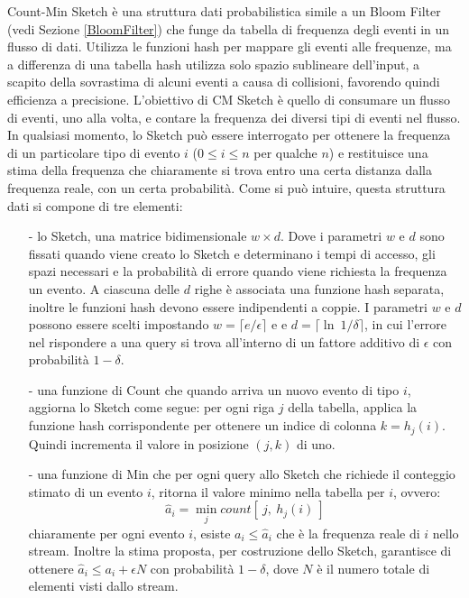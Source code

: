 \documentclass[../main.tex]{subfiles}
\begin{document}
Count-Min Sketch è una struttura dati probabilistica simile a un Bloom Filter (vedi Sezione \ref{BloomFilter}) che funge da tabella di frequenza degli eventi in un flusso di dati. Utilizza le funzioni hash per mappare gli eventi alle frequenze, ma a differenza di una tabella hash utilizza solo spazio sublineare dell'input, a scapito della sovrastima di alcuni eventi a causa di collisioni, favorendo quindi efficienza a precisione. L'obiettivo di CM Sketch è quello di consumare un flusso di eventi, uno alla volta, e contare la frequenza dei diversi tipi di eventi nel flusso. In qualsiasi momento, lo Sketch può essere interrogato per ottenere la frequenza di un particolare tipo di evento $i$ ($0 \leq i \leq n$ per qualche $n$) e restituisce una stima della frequenza che chiaramente si trova entro una certa distanza dalla frequenza reale, con un certa probabilità. Come si può intuire, questa struttura dati si compone di tre elementi: 
\begin{itemize}
\item[-] lo Sketch, una matrice bidimensionale $w \times d$. Dove i parametri $w$ e $d$ sono fissati quando viene creato lo Sketch e determinano i tempi di accesso, gli spazi necessari e la probabilità di errore quando viene richiesta la frequenza un evento. A ciascuna delle $d$ righe è associata una funzione hash separata, inoltre le funzioni hash devono essere indipendenti a coppie. I parametri  $w$ e $d$ possono essere scelti impostando $w = \lceil e / \epsilon \rceil$ e e $ d = \lceil \ln\ 1 / \delta \rceil$, in cui l'errore nel rispondere a una query si trova all'interno di un fattore additivo di $\epsilon$ con probabilità $1-\delta$.

\item[-] una funzione di Count che quando arriva un nuovo evento di tipo $i$, aggiorna lo Sketch come segue: per ogni riga $j$ della tabella, applica la funzione hash corrispondente per ottenere un indice di colonna $k = h_j (i)$. Quindi incrementa il valore in posizione $(j,k)$ di uno.

\item[-] una funzione di Min che per ogni query allo Sketch che richiede il conteggio stimato di un evento $i$, ritorna il valore minimo nella tabella per $i$, ovvero: $$\hat{a}_i = \min_{j} count[\ j,\ h_j (i)\ ]$$ chiaramente per ogni evento $i$, esiste $a_i \leq \hat{a}_i$ che è la frequenza reale di $i$ nello stream. Inoltre la stima proposta, per costruzione dello Sketch, garantisce di ottenere $\hat{a}_i \leq a_i + \epsilon N$ con probabilità $1-\delta$, dove $N$ è il numero totale di elementi visti dallo stream.

\end{itemize}
\end{document}
